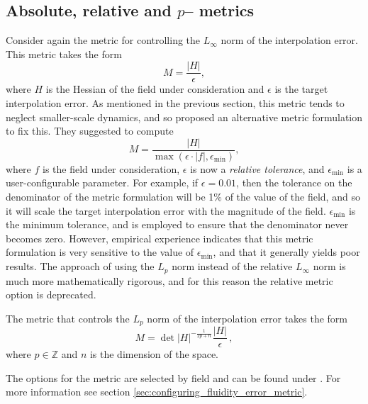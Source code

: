 \subsection{Absolute, relative and $p$-- metrics} \label{sec:absolute_metrics}
Consider again the metric for controlling the $L_{\infty}$ norm of the interpolation error. This metric takes the form
\begin{equation}
M = \frac{\left|H\right|}{\epsilon},
\end{equation}
where $H$ is the Hessian of the field under consideration and $\epsilon$ is the target interpolation error. As mentioned
in the previous section, this metric tends to neglect smaller-scale dynamics, and so \citet{castrodiaz1997} proposed
an alternative metric formulation to fix this. They suggested to compute
\begin{equation}
M = \frac{\left|H\right|}{\max(\epsilon \cdot \left|f\right|, \epsilon_{\textrm{min}})},
\end{equation}
where $f$ is the field under consideration, $\epsilon$ is now a \emph{relative tolerance}, and $\epsilon_{\textrm{min}}$ is a
user-configurable parameter. For example, if $\epsilon = 0.01$, then the tolerance on the denominator of the metric formulation
will be 1\% of the value of the field, and so it will scale the target interpolation error with the magnitude of the field.
$\epsilon_{\textrm{min}}$ is the minimum tolerance, and is employed to ensure that the denominator never becomes zero.
However, empirical experience indicates that this metric formulation is very sensitive to the value of $\epsilon_{\textrm{min}}$,
and that it generally yields poor results. The approach of using the $L_p$ norm instead of the relative $L_{\infty}$ norm is much more mathematically rigorous, and for this reason the relative metric option is deprecated.

The metric that controls the $L_p$ norm of the interpolation error takes the form \citep{chen2007,loseille2010ii}
\begin{equation}
M = \det\left|H\right|^{-\frac{1}{2p+n}} \frac{\left|H\right|}{\epsilon} \, ,
\end{equation}
where $p \in \mathbb{Z}$ and $n$ is the dimension of the space.

The options for the metric are selected by field and can be found under . For more information see section \ref{sec:configuring_fluidity_error_metric}.

